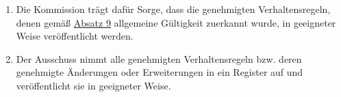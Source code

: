 \begin{enumerate}
  \item Die Kommission trägt dafür Sorge, dass die genehmigten Verhaltensregeln, denen gemäß \hyperref[itm:40-9]
   {Absatz 9} allgemeine Gültigkeit zuerkannt wurde, in geeigneter Weise veröffentlicht werden.
  \label{itm:40-10}

  \item Der Ausschuss nimmt alle genehmigten Verhaltensregeln bzw. deren genehmigte Änderungen oder Erweiterungen in ein
   Register auf und veröffentlicht sie in geeigneter Weise.
  \label{itm:40-11}

\end{enumerate}


